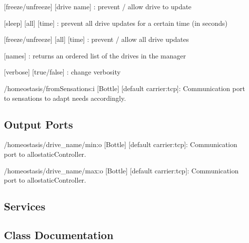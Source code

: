 \begin{DoxyItemize}
\begin{DoxyItemize}
\item \mbox{[}freeze\textquotesingle{}/\textquotesingle{}unfreeze\textquotesingle{}\mbox{]} \mbox{[}drive name\mbox{]} \+: prevent / allow drive to update
\item \mbox{[}\textquotesingle{}sleep\textquotesingle{}\mbox{]} \mbox{[}\textquotesingle{}all\textquotesingle{}\mbox{]} \mbox{[}time\mbox{]} \+: prevent all drive updates for a certain time (in seconds)
\item \mbox{[}freeze\textquotesingle{}/\textquotesingle{}unfreeze\textquotesingle{}\mbox{]} \mbox{[}\textquotesingle{}all\textquotesingle{}\mbox{]} \mbox{[}time\mbox{]} \+: prevent / allow all drive updates
\item \mbox{[}\textquotesingle{}names\textquotesingle{}\mbox{]} \+: returns an ordered list of the drives in the manager
\item \mbox{[}\textquotesingle{}verbose\textquotesingle{}\mbox{]} \mbox{[}true/false\mbox{]} \+: change verbosity
\end{DoxyItemize}
\item /homeostasis/from\+Sensations\+:i \mbox{[}Bottle\mbox{]} \mbox{[}default carrier\+:tcp\mbox{]}\+: Communication port to sensations to adapt needs accordingly.
\end{DoxyItemize}\hypertarget{group__touchDetector_outputports_sec}{}\subsection{Output Ports}\label{group__touchDetector_outputports_sec}

\begin{DoxyItemize}
\item /homeostasis/drive\+\_\+name/min\+:o \mbox{[}Bottle\mbox{]} \mbox{[}default carrier\+:tcp\mbox{]}\+: Communication port to allostatic\+Controller.
\item /homeostasis/drive\+\_\+name/max\+:o \mbox{[}Bottle\mbox{]} \mbox{[}default carrier\+:tcp\mbox{]}\+: Communication port to allostatic\+Controller.
\end{DoxyItemize}\hypertarget{group__touchDetector_services_sec}{}\subsection{Services}\label{group__touchDetector_services_sec}


\subsection{Class Documentation}
\label{classDrive}
